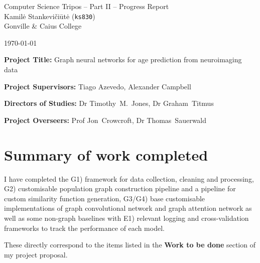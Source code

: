 \documentclass[12pt]{article}
\begin{document}
\begin{center}
\Large
Computer Science Tripos -- Part II -- Progress Report\\[4mm]
\large
Kamilė Stankevičiūtė (\texttt{ks830}) \\ Gonville \& Caius College

\today %
\end{center}

\vspace{5mm}

\textbf{Project Title:} Graph neural networks for age prediction from neuroimaging data

\textbf{Project Supervisors:} Tiago Azevedo, Alexander Campbell

\textbf{Directors of Studies:} Dr Timothy~M.~Jones, Dr Graham~Titmus

\textbf{Project Overseers:} Prof Jon~Crowcroft, Dr Thomas~Sauerwald

\section*{Summary of work completed}

I have completed the G1) framework for data collection, cleaning and processing, G2) customisable population graph construction pipeline and a pipeline for custom similarity function generation, G3/G4) base customisable implementations of graph convolutional network and graph attention network as well as some non-graph baselines with E1) relevant logging and cross-validation frameworks to track the performance of each model. 

These directly correspond to the items listed in the \textbf{Work to be done} section of my project proposal.
\end{document}
